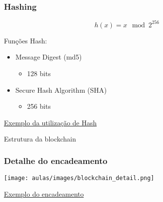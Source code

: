 \documentclass{beamer}
\begin{document}
\begin{frame}
\frametitle{Hashing}

\[ h(x) = x \mod 2^{256} \]

\vspace{0.5cm}

Funções Hash:

\begin{itemize}
    \item Message Digest (md5)
    \begin{itemize}
        \item 128 bits
    \end{itemize}
    \item Secure Hash Algorithm (SHA)
    \begin{itemize}
        \item 256 bits
    \end{itemize}
\end{itemize}
\href{https://andersbrownworth.com/blockchain/hash}{Exemplo da utilização de Hash}

\end{frame}
\begin{frame}
      Estrutura da blockchain
    \begin{center}
\end{center}
\end{frame}

\begin{frame}
\frametitle{Detalhe do encadeamento}
\begin{center}
\texttt{[image: aulas/images/blockchain\_detail.png]}
\end{center}
\href{https://andersbrownworth.com/blockchain/blockchain}{Exemplo do encadeamento}
\end{frame}
\end{document}
